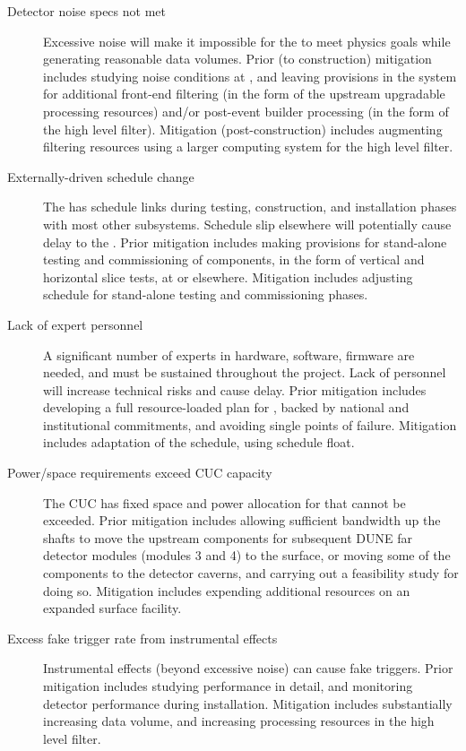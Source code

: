 \begin{description}
\item[Detector noise specs not met] Excessive noise will make it
  impossible for the  to meet physics goals while
  generating reasonable data volumes. Prior (to construction) mitigation includes
  studying noise conditions at , and leaving provisions in the
  system for additional front-end filtering (in the form of the
  upstream  upgradable processing resources) and/or post-event builder processing (in
  the form of the high level filter). Mitigation (post-construction) includes augmenting
  filtering resources using a larger computing system for the high
  level filter.

\item[Externally-driven schedule change] The  has schedule links during
  testing, construction, and installation phases with most other
  subsystems. Schedule slip elsewhere will potentially cause
  delay to the . Prior mitigation includes making provisions for
  stand-alone testing and commissioning of  components, in the form
  of vertical and horizontal slice tests, at  or
  elsewhere. Mitigation includes adjusting schedule for stand-alone
  testing and commissioning phases. 

\item[Lack of expert personnel] A significant number of experts in
  hardware, software, firmware are needed, and must be sustained
  throughout the project. Lack of personnel will increase technical
  risks and cause delay. Prior mitigation includes developing a full
  resource-loaded plan for , backed by national and institutional
  commitments, and avoiding single points of failure. Mitigation
  includes adaptation of the  schedule, using schedule float.

\item[Power/space requirements exceed CUC capacity] The CUC has fixed
  space and power allocation for  
that cannot be exceeded.  Prior mitigation includes allowing
sufficient bandwidth up the shafts to move the upstream  components for
subsequent DUNE far detector modules (modules 3 and 4) to the
surface, or moving some of the  components to the detector caverns,
and carrying out a feasibility study for doing so. 
Mitigation includes expending additional resources on an
expanded surface facility.

\item[Excess fake trigger rate from instrumental effects] Instrumental
  effects (beyond excessive noise) can cause fake triggers. Prior
  mitigation includes studying  performance in detail, and monitoring detector
  performance during installation. Mitigation includes substantially increasing
  data volume, and increasing processing resources in the high level
  filter.


\end{description}
